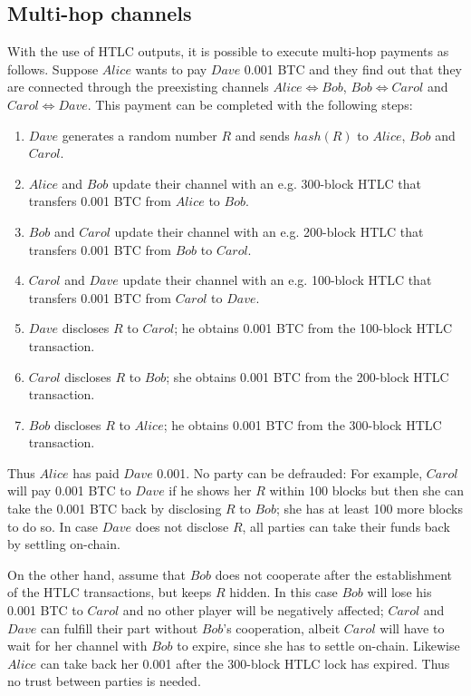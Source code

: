   \subsection{Multi-hop channels}
    With the use of HTLC outputs, it is possible to execute multi-hop payments as follows.
    Suppose $Alice$ wants to pay $Dave$ 0.001 BTC and they find out that they are
    connected through the preexisting channels $Alice \Leftrightarrow Bob$, $Bob
    \Leftrightarrow Carol$ and $Carol \Leftrightarrow Dave$. This payment can be completed
    with the following steps:
    \begin{enumerate}
      \item $Dave$ generates a random number $R$ and sends $hash\left(R\right)$ to
      $Alice$, $Bob$ and $Carol$.
      \item $Alice$ and $Bob$ update their channel with an e.g. 300-block HTLC that
      transfers 0.001 BTC from $Alice$ to $Bob$.
      \item $Bob$ and $Carol$ update their channel with an e.g. 200-block HTLC that
      transfers 0.001 BTC from $Bob$ to $Carol$.
      \item $Carol$ and $Dave$ update their channel with an e.g. 100-block HTLC that
      transfers 0.001 BTC from $Carol$ to $Dave$.
      \item $Dave$ discloses $R$ to $Carol$; he obtains 0.001 BTC from the 100-block HTLC
      transaction.
      \item $Carol$ discloses $R$ to $Bob$; she obtains 0.001 BTC from the 200-block HTLC
      transaction.
      \item $Bob$ discloses $R$ to $Alice$; he obtains 0.001 BTC from the 300-block HTLC
      transaction.
    \end{enumerate}
    Thus $Alice$ has paid $Dave$ 0.001. No party can be defrauded: For example, $Carol$
    will pay 0.001 BTC to $Dave$ if he shows her $R$ within 100 blocks but then she can
    take the 0.001 BTC back by disclosing $R$ to $Bob$; she has at least 100 more blocks
    to do so. In case $Dave$ does not disclose $R$, all parties can take their funds back
    by settling on-chain.

    On the other hand, assume that $Bob$ does not cooperate after the establishment of the
    HTLC transactions, but keeps $R$ hidden. In this case $Bob$ will lose his 0.001 BTC to
    $Carol$ and no other player will be negatively affected; $Carol$ and $Dave$ can
    fulfill their part without $Bob$'s cooperation, albeit $Carol$ will have to wait for
    her channel with $Bob$ to expire, since she has to settle on-chain. Likewise $Alice$
    can take back her 0.001 after the 300-block HTLC lock has expired. Thus no trust
    between parties is needed.

